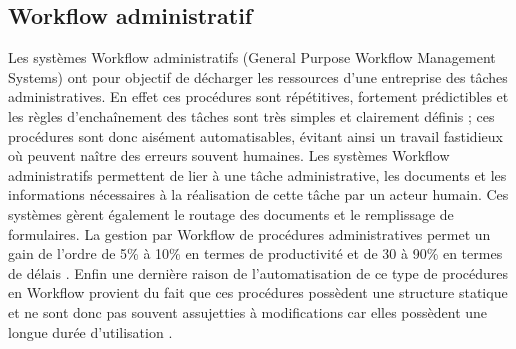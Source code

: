 \subsection{Workflow administratif }
Les systèmes Workflow administratifs (General Purpose Workflow Management Systems) ont pour objectif de décharger les ressources d’une entreprise des tâches administratives. En effet ces procédures sont répétitives, fortement prédictibles et les règles
d’enchaînement des tâches sont très simples et clairement définis ; ces procédures sont donc
aisément automatisables, évitant ainsi un travail fastidieux où peuvent naître des erreurs souvent humaines. Les systèmes Workflow administratifs permettent de lier à une tâche administrative, les documents et les informations nécessaires à la réalisation de cette tâche par un acteur humain. Ces systèmes gèrent également le routage des documents et le remplissage de
formulaires. La gestion par Workflow de procédures administratives permet un gain de
l’ordre de 5\% à 10\% en termes de productivité et de 30 à 90\% en termes de délais \parencite{Ader}. Enfin une dernière raison de l’automatisation de ce type de procédures en Workflow provient du fait que ces procédures possèdent une structure statique et ne sont donc pas souvent
assujetties à modifications car elles possèdent une longue durée d’utilisation \parencite{Scheer}. 
